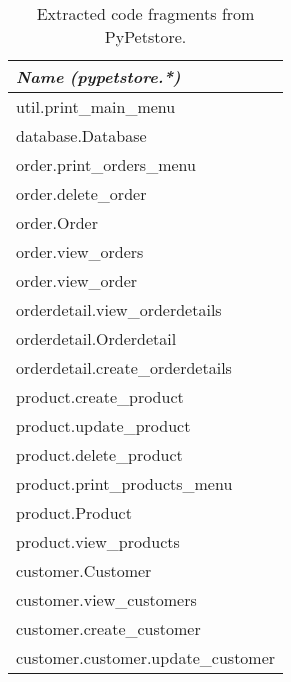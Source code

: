 \begin{table}[h]
    \footnotesize
    \centering
    \captionsetup{justification=centering ,margin=1.5cm, labelfont=bf, font=footnotesize}
    \caption{Extracted code fragments from PyPetstore.}\label{tab:pypetstore_code_fragments}
    \begin{subtable}[h]{0.45\textwidth}
        \begin{tabular}{ >{\raggedright\arraybackslash}m{160pt}}
            \toprule
            \textit{Name} \newline \textit{(pypetstore.*)}\\
            \midrule
            util.print\_main\_menu\\
            \midrule
            database.Database\\
            \midrule
            order.print\_orders\_menu\\
            \midrule
            order.delete\_order\\
            \midrule
            order.Order\\
            \midrule
            order.view\_orders\\
            \midrule
            order.view\_order\\
            \midrule
            orderdetail.view\_orderdetails\\
            \midrule
            orderdetail.Orderdetail\\
            \midrule
            orderdetail.create\_orderdetails\\
            \midrule
            product.create\_product\\
            \midrule
            product.update\_product\\
            \midrule
            product.delete\_product\\
            \midrule
            product.print\_products\_menu\\
            \midrule
            product.Product\\
            \midrule
            product.view\_products\\
            \midrule
            customer.Customer\\
            \midrule
            customer.view\_customers\\
            \midrule
            customer.create\_customer\\
            \midrule
            customer.customer.update\_customer\\
            \midrule

\end{tabular}
\end{subtable}
\end{table}
